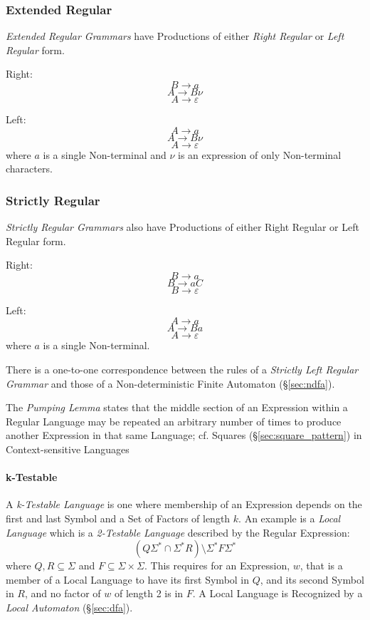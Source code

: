 \subsubsection{Extended Regular}\label{sec:extended_regular}

\emph{Extended Regular Grammars} have Productions of either \emph{Right Regular}
or \emph{Left Regular} form.

Right:
\[
  B \rightarrow a
\]\[
  A \rightarrow B \nu
\]\[
  A \rightarrow \varepsilon
\]

Left:
\[
  A \rightarrow a
\]\[
  A \rightarrow B \nu
\]\[
  A \rightarrow \varepsilon
\]
where $a$ is a single Non-terminal and $\nu$ is an expression of only
Non-terminal characters.



\subsubsection{Strictly Regular}\label{sec:strictly_regular}

\emph{Strictly Regular Grammars} also have Productions of either Right Regular
or Left Regular form.

Right:
\[
  B \rightarrow a
\]\[
  B \rightarrow aC
\]\[
  B \rightarrow \varepsilon
\]

Left:
\[
  A \rightarrow a
\]\[
  A \rightarrow Ba
\]\[
  A \rightarrow \varepsilon
\]
where $a$ is a single Non-terminal.

There is a one-to-one correspondence between the rules of a \emph{Strictly Left
  Regular Grammar} and those of a Non-deterministic Finite Automaton
(\S\ref{sec:ndfa}).

The \emph{Pumping Lemma} states that the middle section of an Expression within
a Regular Language may be repeated an arbitrary number of times to produce
another Expression in that same Language; cf. Squares
(\S\ref{sec:square_pattern}) in Context-sensitive Languages



\paragraph{k-Testable}\label{sec:k_testable}\hfill

A \emph{k-Testable Language} is one where membership of an Expression depends on
the first and last Symbol and a Set of Factors of length $k$. An example is a
\emph{Local Language} which is a \emph{2-Testable Language} described by the
Regular Expression:
\[
  (Q\Sigma^* \cap \Sigma^*R)\setminus\Sigma^*F\Sigma^*
\]
where $Q,R \subseteq \Sigma$ and $F \subseteq \Sigma \times \Sigma$. This
requires for an Expression, $w$, that is a member of a Local Language to have
its first Symbol in $Q$, and its second Symbol in $R$, and no factor of $w$ of
length 2 is in $F$. A Local Language is Recognized by a \emph{Local Automaton}
(\S\ref{sec:dfa}).



